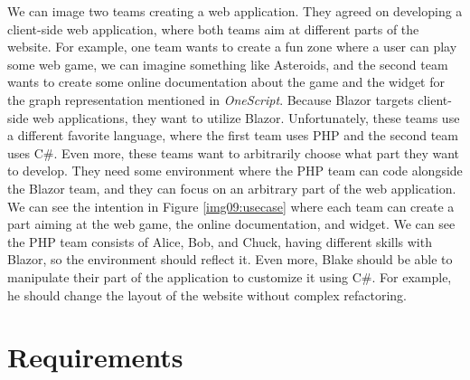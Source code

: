 We can image two teams creating a web application. 
They agreed on developing a client-side web application, where both teams aim at different parts of the website.
For example, one team wants to create a fun zone where a user can play some web game, we can imagine something like Asteroids, and the second team wants to create some online documentation about the game and the widget for the graph representation mentioned in \textit{OneScript}.
Because Blazor targets client-side web applications, they want to utilize Blazor.
Unfortunately, these teams use a different favorite language, where the first team uses PHP and the second team uses C\#.
Even more, these teams want to arbitrarily choose what part they want to develop.
They need some environment where the PHP team can code alongside the Blazor team, and they can focus on an arbitrary part of the web application.
We can see the intention in Figure \ref{img09:usecase} where each team can create a part aiming at the web game, the online documentation, and widget.
We can see the PHP team consists of Alice, Bob, and Chuck, having different skills with Blazor, so the environment should reflect it.
Even more, Blake should be able to manipulate their part of the application to customize it using C\#. For example, he should change the layout of the website without complex refactoring. 

\section{Requirements}

